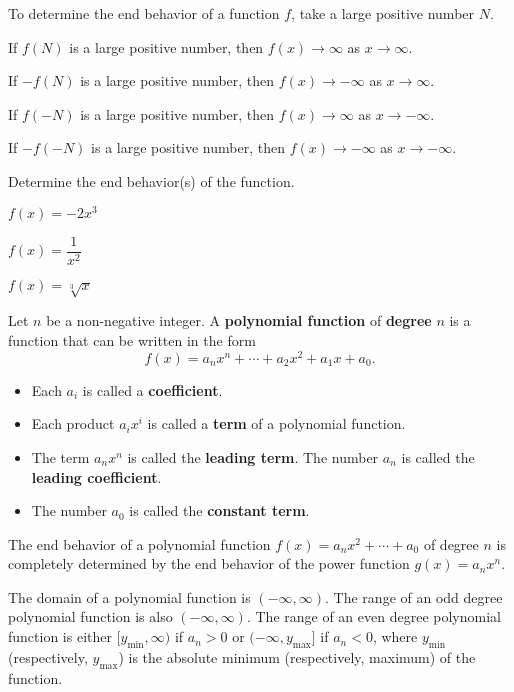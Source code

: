 \begin{howto}
  To determine the end behavior of a function $f$, take a large positive number $N$. 
  
  If $f(N)$ is a large positive number, then $f(x)\to \infty$ as $x\to \infty$. 
  
  If $-f(N)$ is a large positive number, then $f(x)\to -\infty$ as $x\to \infty$.
  
  If $f(-N)$ is a large positive number, then $f(x)\to\infty$ as $x\to -\infty$. 
  
  If $-f(-N)$ is a large positive number, then $f(x)\to-\infty$ as $x\to -\infty$.
\end{howto}

\begin{example}
  Determine the end behavior(s) of the function.\\
  \begin{enumerate*}
    \item $f(x)=-2x^3$
    \item $f(x)=\dfrac{1}{x^2}$
    \item $f(x)=\sqrt[3]{x}$\hfill\null
  \end{enumerate*}
\end{example}

\newpage

\begin{definition}
  Let $n$ be a non-negative integer. A \textbf{polynomial function} of \textbf{degree} $n$ is a function that can be written in the form 
  \[f(x)=a_nx^n + \cdots + a_2x^2 + a_1x + a_0.\]
\begin{itemize}
  \item Each \(a_i\) is called a \textbf{coefficient}. 
  \item Each product \(a_ix^i\) is called a \textbf{term} of a polynomial function.
  \item The term $a_nx^n$ is called the \textbf{leading term}. The number $a_n$ is called the \textbf{leading coefficient}.
  \item The number $a_0$ is called the \textbf{constant term}.
\end{itemize}
\end{definition}

\begin{note}
  The end behavior of a polynomial function $f(x)=a_nx^2+\cdots +a_0$ of degree $n$ is completely determined by the end behavior of the power function $g(x)=a_nx^n$.
  
  The domain of a polynomial function is $(-\infty, \infty)$. The range of an odd degree polynomial function is also $(-\infty, \infty)$. The range of an even degree polynomial function is either $[y_\text{min}, \infty)$ if $a_n>0$ or $(-\infty, y_\text{max}]$ if $a_n<0$, where $y_\text{min}$ (respectively, $y_\text{max}$) is the absolute minimum (respectively, maximum) of the function. 
\end{note}

